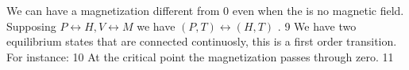 \documentclass[../main/main.tex]{subfiles}
\begin{document}
We can have a magnetization different from 0 even when the is no magnetic field.
Supposing \( P \leftrightarrow H, V \leftrightarrow M \) we have \( (P,T) \leftrightarrow (H,T) \) .
9
We have two equilibrium states that are connected continuosly, this is a first order transition.
For instance:
10
At the critical point the magnetization passes through zero.
11
\end{document}
